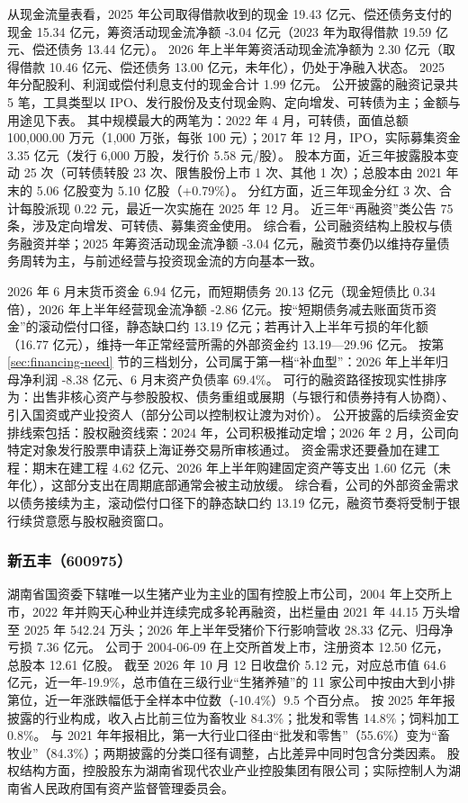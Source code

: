  从现金流量表看，2025 年公司取得借款收到的现金 19.43 亿元、偿还债务支付的现金 15.34 亿元，筹资活动现金流净额 -3.04 亿元（2023 年为取得借款 19.59 亿元、偿还债务 13.44 亿元）。 2026 年上半年筹资活动现金流净额为 2.30 亿元（取得借款 10.46 亿元、偿还债务 13.00 亿元，未年化），仍处于净融入状态。 2025 年分配股利、利润或偿付利息支付的现金合计 1.99 亿元。 公开披露的融资记录共 5 笔，工具类型以 IPO、发行股份及支付现金购、定向增发、可转债为主；金额与用途见下表。 其中规模最大的两笔为：2022 年 4 月，可转债，面值总额 100,000.00 万元（1,000 万张，每张 100 元）；2017 年 12 月，IPO，实际募集资金 3.35 亿元（发行 6,000 万股，发行价 5.58 元/股）。 股本方面，近三年披露股本变动 25 次（可转债转股 23 次、限售股份上市 1 次、其他 1 次）；总股本由 2021 年末的 5.06 亿股变为 5.10 亿股（+0.79\%）。 分红方面，近三年现金分红 3 次、合计每股派现 0.22 元，最近一次实施在 2025 年 12 月。 近三年“再融资”类公告 75 条，涉及定向增发、可转债、募集资金使用。 综合看，公司融资结构上股权与债务融资并举；2025 年筹资活动现金流净额 -3.04 亿元，融资节奏仍以维持存量债务周转为主，与前述经营与投资现金流的方向基本一致。

 2026 年 6 月末货币资金 6.94 亿元，而短期债务 20.13 亿元（现金短债比 0.34 倍），2026 年上半年经营现金流净额 -2.86 亿元。按“短期债务减去账面货币资金”的滚动偿付口径，静态缺口约 13.19 亿元；若再计入上半年亏损的年化额（16.77 亿元），维持一年正常经营所需的外部资金约 13.19---29.96 亿元。 按第 \ref{sec:financing-need} 节的三档划分，公司属于第一档“补血型”：2026 年上半年归母净利润 -8.38 亿元、6 月末资产负债率 69.4\%。 可行的融资路径按现实性排序为：出售非核心资产与参股股权、债务重组或展期（与银行和债券持有人协商）、引入国资或产业投资人（部分公司以控制权让渡为对价）。 公开披露的后续资金安排线索包括：股权融资线索：2024 年，公司积极推动定增；2026 年 2 月，公司向特定对象发行股票申请获上海证券交易所审核通过。 资金需求还要叠加在建工程：期末在建工程 4.62 亿元、2026 年上半年购建固定资产等支出 1.60 亿元（未年化），这部分支出在周期底部通常会被主动放缓。 综合看，公司的外部资金需求以债务接续为主，滚动偿付口径下的静态缺口约 13.19 亿元，融资节奏将受制于银行续贷意愿与股权融资窗口。




\subsubsection{新五丰（600975）}
\label{co:600975}

 湖南省国资委下辖唯一以生猪产业为主业的国有控股上市公司，2004 年上交所上市，2022 年并购天心种业并连续完成多轮再融资，出栏量由 2021 年 44.15 万头增至 2025 年 542.24 万头；2026 年上半年受猪价下行影响营收 28.33 亿元、归母净亏损 7.36 亿元。 公司于 2004-06-09 在上交所首发上市，注册资本 12.50 亿元，总股本 12.61 亿股。 截至 2026 年 10 月 12 日收盘价 5.12 元，对应总市值 64.6 亿元，近一年-19.9\%，总市值在三级行业“生猪养殖”的 11 家公司中按由大到小排第位，近一年涨跌幅低于全样本中位数（-10.4\%）9.5 个百分点。 按 2025 年年报披露的行业构成，收入占比前三位为畜牧业 84.3\%；批发和零售 14.8\%；饲料加工 0.8\%。 与 2021 年年报相比，第一大行业口径由“批发和零售”（55.6\%）变为“畜牧业”（84.3\%）；两期披露的分类口径有调整，占比差异中同时包含分类因素。 股权结构方面，控股股东为湖南省现代农业产业控股集团有限公司；实际控制人为湖南省人民政府国有资产监督管理委员会。

